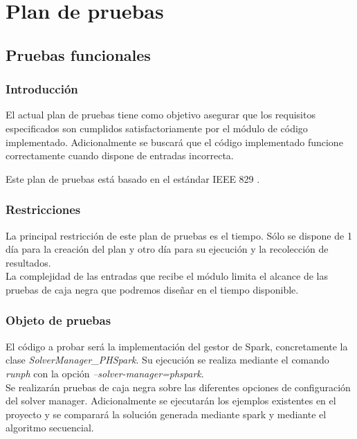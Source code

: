 \chapter{Plan de pruebas}

\section{Pruebas funcionales}

\subsection{Introducción}

El actual plan de pruebas tiene como objetivo asegurar que los requisitos especificados son cumplidos satisfactoriamente por el módulo de código implementado. Adicionalmente se buscará que el código implementado funcione correctamente cuando dispone de entradas incorrecta.

Este plan de pruebas está basado en el estándar IEEE 829 \cite{IEEE829}.

\subsection{Restricciones}

La principal restricción de este plan de pruebas es el tiempo. Sólo se dispone de 1 día para la creación del plan y otro día para su ejecución y la recolección de resultados.\\

La complejidad de las entradas que recibe el módulo limita el alcance de las pruebas de caja negra que podremos diseñar en el tiempo disponible.

\subsection{Objeto de pruebas}

El código a probar será la implementación del gestor de Spark, concretamente la clase {\it SolverManager\_PHSpark}. Su ejecución se realiza mediante el comando {\it runph} con la opción {\it --solver-manager=phspark}.\\

Se realizarán pruebas de caja negra sobre las diferentes opciones de configuración del solver manager. Adicionalmente se ejecutarán los ejemplos existentes en el proyecto y se comparará la solución generada mediante spark y mediante el algoritmo secuencial.


